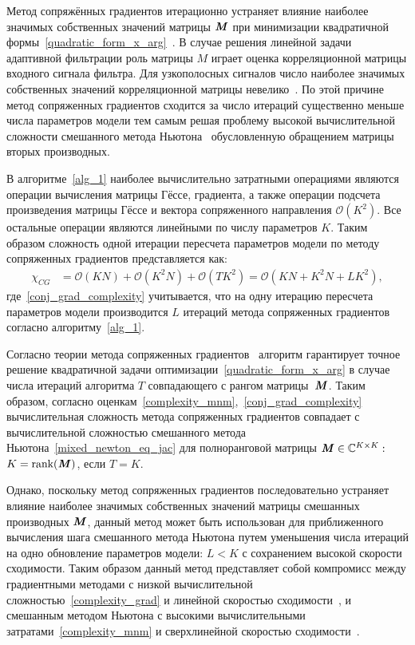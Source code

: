 Метод сопряжённых градиентов итерационно устраняет влияние наиболее значимых собственных значений матрицы $\textbf{\textit{M}}$ при минимизации квадратичной формы~\eqref{quadratic_form_x_arg}~\cite{HestenesStiefel1952}. В случае решения линейной задачи адаптивной фильтрации роль матрицы $M$ играет оценка корреляционной матрицы входного сигнала фильтра. Для узкополосных сигналов число наиболее значимых собственных значений корреляционной матрицы невелико~\cite{deLamare2015}. По этой причине метод сопряженных градиентов сходится за число итераций существенно меньше числа параметров модели тем самым решая проблему высокой вычислительной сложности смешанного метода Ньютона~\cite{mnm_paper_alex_degt} обусловленную обращением матрицы вторых производных.

В алгоритме~\ref{alg_1} наиболее вычислительно затратными операциями являются операции вычисления матрицы Гёссе, градиента, а также операции подсчета произведения матрицы Гёссе и вектора сопряженного направления $\mathcal{O}(K^2)$. Все остальные операции являются линейными по числу параметров $K$. Таким образом сложность одной итерации пересчета параметров модели по методу сопряженных градиентов представляется как:
\begin{align}
	\chi_{CG}&=\mathcal{O}(KN)+\mathcal{O}(K^2N)+\mathcal{O}(TK^2)=\mathcal{O}(KN+K^2N+LK^2),
	\label{conj_grad_complexity}    
\end{align}
где~\eqref{conj_grad_complexity} учитывается, что на одну итерацию пересчета параметров модели производится $L$ итераций метода сопряженных градиентов согласно алгоритму~\ref{alg_1}.

Согласно теории метода сопряженных градиентов~\cite{HestenesStiefel1952} алгоритм гарантирует точное решение квадратичной задачи оптимизации~\eqref{quadratic_form_x_arg} в случае числа итераций алгоритма $T$ совпадающего с рангом матрицы~$\textbf{\textit{M}}$. Таким образом, согласно оценкам~\eqref{complexity_mnm},~\eqref{conj_grad_complexity} вычислительная сложность метода сопряженных градиентов совпадает с вычислительной сложностью смешанного метода Ньютона~\eqref{mixed_newton_eq_jac} для полноранговой матрицы $\textbf{\textit{M}}\in\mathbb{C}^{K\times K}:$ $K=\text{rank}(\textbf{\textit{M}})$, если $T=K$.

Однако, поскольку метод сопряженных градиентов последовательно устраняет влияние наиболее значимых собственных значений матрицы смешанных производных $\textbf{\textit{M}}$, данный метод может быть использован для приближенного вычисления шага смешанного метода Ньютона путем уменьшения числа итераций на одно обновление параметров модели: $L<K$ с сохранением высокой скорости сходимости. Таким образом данный метод представляет собой компромисс между градиентными методами с низкой вычислительной сложностью~\eqref{complexity_grad} и линейной скоростью сходимости~\cite{nesterov2004}, и смешанным методом Ньютона с высокими вычислительными затратами~\eqref{complexity_mnm} и сверхлинейной скоростью сходимости~\cite{mixed_newton}.

